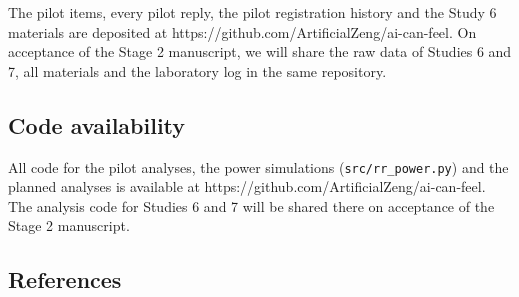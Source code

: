 \documentclass[
  11pt,
]{article}
\begin{document}
The pilot items, every pilot reply, the pilot registration history and
the Study 6 materials are deposited at
https://github.com/ArtificialZeng/ai-can-feel. On acceptance of the
Stage 2 manuscript, we will share the raw data of Studies 6 and 7, all
materials and the laboratory log in the same repository.

\hypertarget{code-availability}{%
\subsection{Code availability}\label{code-availability}}

All code for the pilot analyses, the power simulations
(\texttt{src/rr\_power.py}) and the planned analyses is available at
https://github.com/ArtificialZeng/ai-can-feel. The analysis code for
Studies 6 and 7 will be shared there on acceptance of the Stage 2
manuscript.

\hypertarget{references}{%
\subsection{References}\label{references}}
\end{document}
